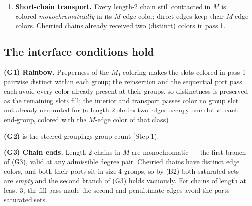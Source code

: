 \documentclass[11pt]{article}
\theoremstyle{definition}
\theoremstyle{remark}
\begin{document}
\begin{enumerate}
  \textbf{Interior fills.} Two cases, matching the formal fill lemma\textquotesingle s split. For a chain of length exactly 3, one interior edge remains; give it a color outside the union of the two ports\textquotesingle{} saturated sets, which has at most \(2 + 2 = 4\) elements --- its distance-two constraint (the two ports differ) was already enforced by the port pass. For a chain of length at least 4, fill the interior sequentially from one end: each edge avoids its at most two already-colored distance-two neighbors (the edge two positions behind it and, near the far end, the far port), and the second and penultimate edges additionally avoid the near port\textquotesingle s saturated set, of size at most 2 --- at most 4 forbidden colors in every case. Pure-cycle interiors are filled by the same distance-two argument around the cycle.\footnote{Lean: \texttt{isFill\_exists} with \texttt{exists\_avoid} (stated for palettes of size at least 5), plus the cycle path \texttt{cycle\_distance2}; the lemma takes the length-3 case separately, through the hypothesis that the two port colors differ when the length is 3. These are reused from the six-color development, where they were built palette-generically.}
\item
  \textbf{Short-chain transport.} Every length-2 chain still contracted in \(M\) is colored \emph{monochromatically} in its \(M\)-edge color; direct edges keep their \(M\)-edge colors. Cherried chains already received two (distinct) colors in pass 1.
\end{enumerate}

\subsection{The interface conditions hold}\label{25-the-interface-conditions-hold}

\textbf{(G1) Rainbow.} Properness of the \(M_0\)-coloring makes the slots colored in pass 1 pairwise distinct within each group; the reinsertion and the sequential port pass each avoid every color already present at their groups, so distinctness is preserved as the remaining slots fill; the interior and transport passes color no group slot not already accounted for (a length-2 chain\textquotesingle s two edges occupy one slot at each end-group, colored with the \(M\)-edge color of that class).

\textbf{(G2)} is the steered grouping\textquotesingle s group count (Step 1).

\textbf{(G3) Chain ends.} Length-2 chains in \(M\) are monochromatic --- the first branch of (G3), valid at any admissible degree pair. Cherried chains have distinct edge colors, and both their ports sit in size-4 groups, so by (B2) both saturated sets are \emph{empty} and the second branch of (G3) holds vacuously. For chains of length at least 3, the fill pass made the second and penultimate edges avoid the ports\textquotesingle{} saturated sets.
\end{document}
